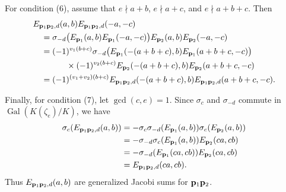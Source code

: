 \documentclass[a4paper, 11pt]{amsart}
\theoremstyle{plain}
\theoremstyle{definition}
\numberwithin{equation}{section}
\begin{document}
For condition (6), assume that $e\nmid a+b$, $e\nmid a+c$, and
$e\nmid a+b+c$. Then
\[
\begin{aligned}
&E_{{\bf p}_1{\bf p}_2,d}(a,b)
 E_{{\bf p}_1{\bf p}_2,d}(-a,-c)\\
&\quad=
\sigma_{-d}\bigl(E_{{\bf p}_1}(a,b)E_{{\bf p}_1}(-a,-c)\bigr)
E_{{\bf p}_2}(a,b)E_{{\bf p}_2}(-a,-c)\\
&\quad=
(-1)^{v_1(b+c)}
\sigma_{-d}\bigl(
E_{{\bf p}_1}(-(a+b+c),b)E_{{\bf p}_1}(a+b+c,-c)
\bigr)\\
&\qquad\qquad\times
(-1)^{v_2(b+c)}
E_{{\bf p}_2}(-(a+b+c),b)E_{{\bf p}_2}(a+b+c,-c)\\
&\quad=
(-1)^{(v_1+v_2)(b+c)}
E_{{\bf p}_1{\bf p}_2,d}(-(a+b+c),b)
E_{{\bf p}_1{\bf p}_2,d}(a+b+c,-c).
\end{aligned}
\]

Finally, for condition (7), let $\gcd(c,e)=1$. Since $\sigma_c$ and
$\sigma_{-d}$ commute in $\operatorname{Gal}(K(\zeta_e)/K)$, we have
\[
\begin{aligned}
\sigma_c(E_{{\bf p}_1{\bf p}_2,d}(a,b))
&=
-\sigma_c\sigma_{-d}(E_{{\bf p}_1}(a,b))
 \sigma_c(E_{{\bf p}_2}(a,b))\\
&=
-\sigma_{-d}\sigma_c(E_{{\bf p}_1}(a,b))
 E_{{\bf p}_2}(ca,cb)\\
&=
-\sigma_{-d}(E_{{\bf p}_1}(ca,cb))
 E_{{\bf p}_2}(ca,cb)\\
&=
E_{{\bf p}_1{\bf p}_2,d}(ca,cb).
\end{aligned}
\]
Thus $E_{{\bf p}_1{\bf p}_2,d}(a,b)$ are generalized Jacobi sums for ${\bf p}_1{\bf p}_2$.
\end{document}
